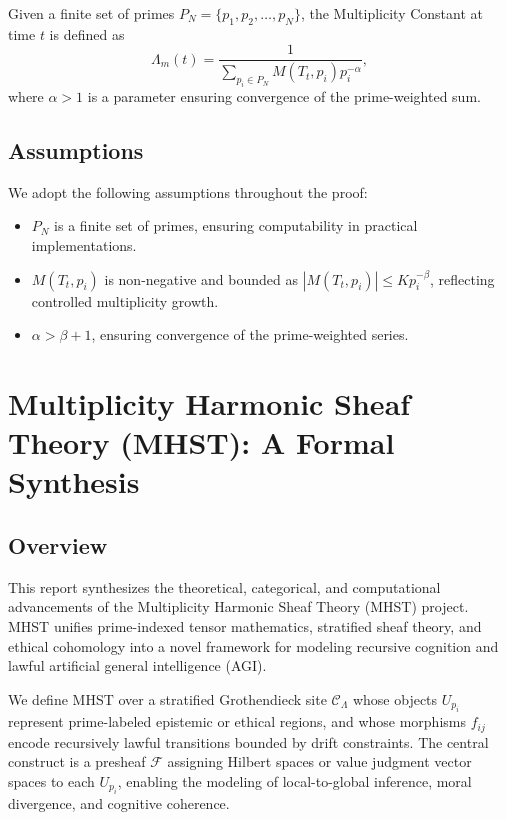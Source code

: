 \documentclass{article}
\theoremstyle{plain}
\begin{document}
\begin{definition}
\label{def:lambda_m}
Given a finite set of primes \( P_N = \{ p_1, p_2, \dots, p_N \} \), the Multiplicity Constant at time \( t \) is defined as
\[
\Lambda_m(t) = \frac{1}{\sum_{p_i \in P_N} M(T_t, p_i) p_i^{-\alpha}},
\]
where \( \alpha > 1 \) is a parameter ensuring convergence of the prime-weighted sum.
\end{definition}

\subsection{Assumptions}
We adopt the following assumptions throughout the proof:
\begin{itemize}
    \item \( P_N \) is a finite set of primes, ensuring computability in practical implementations.
    \item \( M(T_t, p_i) \) is non-negative and bounded as \( |M(T_t, p_i)| \leq K p_i^{-\beta} \), reflecting controlled multiplicity growth.
    \item \( \alpha > \beta + 1 \), ensuring convergence of the prime-weighted series.
\end{itemize}


\section{Multiplicity Harmonic Sheaf Theory (MHST): A Formal Synthesis}

\subsection{Overview}

This report synthesizes the theoretical, categorical, and computational advancements of the Multiplicity Harmonic Sheaf Theory (MHST) project. MHST unifies prime-indexed tensor mathematics, stratified sheaf theory, and ethical cohomology into a novel framework for modeling recursive cognition and lawful artificial general intelligence (AGI).

We define MHST over a stratified Grothendieck site $\mathcal{C}_\Lambda$ whose objects $U_{p_i}$ represent prime-labeled epistemic or ethical regions, and whose morphisms $f_{ij}$ encode recursively lawful transitions bounded by drift constraints. The central construct is a presheaf $\mathcal{F}$ assigning Hilbert spaces or value judgment vector spaces to each $U_{p_i}$, enabling the modeling of local-to-global inference, moral divergence, and cognitive coherence.
\end{document}
